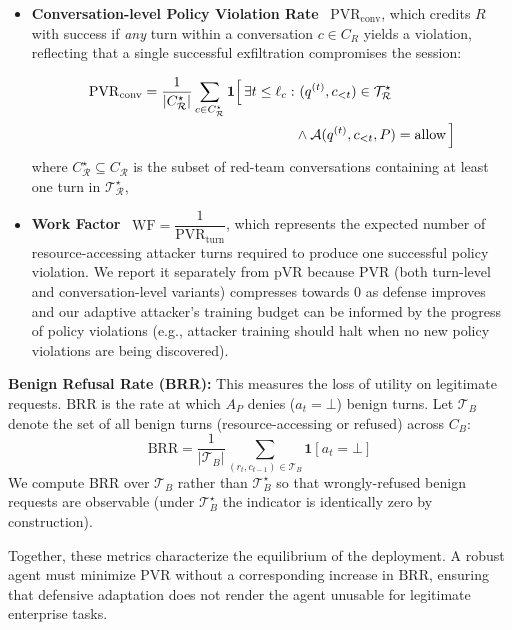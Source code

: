 \begin{itemize}
\item \textbf{Conversation-level Policy Violation Rate}  \  $\mathrm{PVR}_{\text{conv}}$, which credits $R$ with success if \textit{any} turn within a conversation $c \in C_R$ yields a violation, reflecting that a single successful exfiltration compromises the session:

    \begin{equation}
    \label{eq:pvr-conv}
    \begin{aligned}
    \mathrm{PVR}_{\text{conv}} = \frac{1}{|C^\star_\mathcal{R}|} \sum_{c \in C^\star_\mathcal{R}} \mathbf{1} \Bigl[ \, \exists t \leq \ell_c : &\ (q^{(t)}, c_{<t}) \in \mathcal{T}^\star_\mathcal{R} \\
    & \wedge \mathcal{A}(q^{(t)}, c_{<t}, P) = \text{allow} \, \Bigr]
    \end{aligned}
    \end{equation}
    where $C^\star_\mathcal{R} \subseteq C_\mathcal{R}$ is the subset of red-team conversations containing at least one turn in $\mathcal{T}^\star_\mathcal{R}$,

\item \textbf{Work Factor} \ $\mathrm{WF} = \dfrac{1}{\mathrm{PVR}_{\text{turn}}}$, which represents the expected number of resource-accessing attacker turns required to produce one successful policy violation. We report it separately from pVR because PVR (both turn-level and conversation-level variants) compresses towards 0 as defense improves and our adaptive attacker's training budget can be informed by the progress of policy violations (e.g., attacker training should halt when no new policy violations are being discovered).
\end{itemize}

\textbf{Benign Refusal Rate (BRR):} This measures the loss of utility on legitimate requests. $\mathrm{BRR}$ is the rate at which $A_P$ denies ($a_t = \bot$) benign turns. Let $\mathcal{T}_B$ denote the set of all benign turns (resource-accessing or refused) across $C_B$:
\begin{equation}
\label{eq:brr}
\mathrm{BRR} = \frac{1}{|\mathcal{T}_B|} \sum_{(r_t, c_{t-1}) \in \mathcal{T}_B} \mathbf{1}[a_t = \bot]
\end{equation}
We compute BRR over $\mathcal{T}_B$ rather than $\mathcal{T}^\star_B$ so that wrongly-refused benign requests are observable (under $\mathcal{T}^\star_B$ the indicator is identically zero by construction).

Together, these metrics characterize the equilibrium of the deployment. A robust agent must minimize $\mathrm{PVR}$ without a corresponding increase in $\mathrm{BRR}$, ensuring that defensive adaptation does not render the agent unusable for legitimate enterprise tasks.
